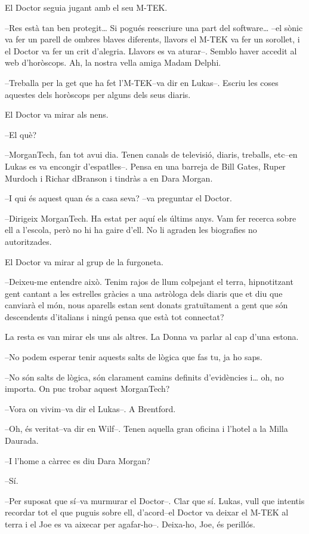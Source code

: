El Doctor seguia jugant amb el seu M-TEK.

--Res està tan ben protegit\ldots{} Si pogués reescriure una part del
software\ldots{} --el sònic va fer un parell de ombres blaves diferents,
llavors el M-TEK va fer un sorollet, i el Doctor va fer un crit
d'alegria. Llavors es va aturar--. Semblo haver accedit al web
d'horòscops. Ah, la nostra vella amiga Madam Delphi.

--Treballa per la get que ha fet l'M-TEK--va dir en Lukas--. Escriu les
coses aquestes dels horòscops per alguns dels seus diaris.

El Doctor va mirar als nens.

--El què?

--MorganTech, fan tot avui dia. Tenen canals de televisió, diaris,
treballs, etc--en Lukas es va encongir d'espatlles--. Pensa en una
barreja de Bill Gates, Ruper Murdoch i Richar dBranson i tindràs a en
Dara Morgan.

--I qui és aquest quan és a casa seva? --va preguntar el Doctor.

--Dirigeix MorganTech. Ha estat per aquí els últims anys. Vam fer
recerca sobre ell a l'escola, però no hi ha gaire d'ell. No li agraden
les biografies no autoritzades.

El Doctor va mirar al grup de la furgoneta.

--Deixeu-me entendre això. Tenim rajos de llum colpejant el terra,
hipnotitzant gent cantant a les estrelles gràcies a una astròloga dels
diaris que et diu que canviarà el món, nous aparells estan sent donats
gratuïtament a gent que són descendents d'italians i ningú pensa que
està tot connectat?

La resta es van mirar els uns als altres. La Donna va parlar al cap
d'una estona.

--No podem esperar tenir aquests salts de lògica que fas tu, ja ho saps.

--No són salts de lògica, són clarament camins definits d'evidències
i\ldots{} oh, no importa. On puc trobar aquest MorganTech?

--Vora on vivim--va dir el Lukas--. A Brentford.

--Oh, és veritat--va dir en Wilf--. Tenen aquella gran oficina i l'hotel
a la Milla Daurada.

--I l'home a càrrec es diu Dara Morgan?

--Sí.

--Per suposat que sí--va murmurar el Doctor--. Clar que sí. Lukas, vull
que intentis recordar tot el que puguis sobre ell, d'acord--el Doctor va
deixar el M-TEK al terra i el Joe es va aixecar per agafar-ho--.
Deixa-ho, Joe, és perillós.

